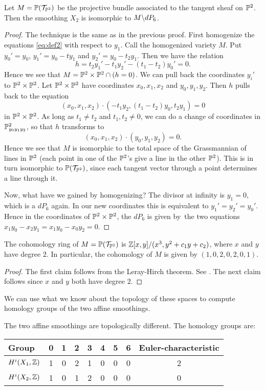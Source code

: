 \begin{lemma}
Let $M=\mathbb{P}(\mathcal T_ {\mathbb{P}^2})$ be the projective bundle associated to the tangent sheaf on $\mathbb{P}^2$. Then the smoothing $X_2$ is isomorphic to $M \backslash dP_6$. 
\end{lemma}
\begin{proof}
The technique is the same as in the previous proof. First homogenize the equations \eqref{eq:def2} with respect to $y_1$. Call the homogenized variety $M$. Put $y_0'=y_0$, $y_1' = y_0-ty_1$ and $y_2'=y_0-t_2y_1$. Then we have the relation
\[
h = t_2y_1'-t_1y_2' - (t_1-t_2)y_0' = 0.
\]
Hence we see that $M=\mathbb{P}^2 \times \mathbb{P}^2 \cap (h = 0)$. We can pull back the coordinates $y_i'$ to $\mathbb{P}^2 \times \mathbb{P}^2$. Let $\mathbb{P}^2 \times \mathbb{P}^2$ have coordinates $x_0,x_1,x_2$ and $y_0,y_1,y_2$. Then $h$ pulls back to the equation
\[
(x_0,x_1,x_2) \cdot (-t_1y_2, (t_1-t_2)y_0,t_2y_1) = 0
\]
in $\mathbb{P}^2 \times \mathbb{P}^2$. As long as $t_1 \neq t_2$ and $t_1,t_2 \neq 0$, we can do a change of coordinates in $\mathbb{P}^2_{y_0y_1y_2}$, so that $h$ transforms to
\[
(x_0,x_1,x_2) \cdot(y_0,y_1,y_2) = 0.
\]
Hence we see that $M$ is isomorphic to the total space of the Grassmannian of lines in $\mathbb{P}^2$ (each point in one of the $\mathbb{P}^2$'s give a line in the other $\mathbb{P}^2$). This is in turn isomorphic to $\mathbb{P}(\mathcal T_{\mathbb{P}^2})$, since each tangent vector through a point determines a line through it.

Now, what have we gained by homogenizing? The divisor at infinity is $y_1=0$, which is a $dP_6$ again. In our new coordinates this is equivalent to $y_1'=y_2'=y_0'$. Hence in the coordinates of $\mathbb{P}^2 \times \mathbb{P}^2$, the $dP_6$ is given by the two equations $x_1y_0-x_2y_1=x_1y_0-x_0y_2=0$. 
\end{proof}

\begin{lemma}
The cohomology ring of $M=\mathbb{P}(\mathcal T_{\mathbb{P}^2})$ is $\mathbb{Z}[x,y]/(x^3,y^2+c_1y+c_2)$, where $x$ and $y$ have degree $2$. In particular, the cohomology of $M$ is given by $(1,0,2,0,2,0,1)$.
\end{lemma}
\begin{proof}
The first claim follows from the Leray-Hirch theorem. See \cite[page 270]{bott_tu}. The next claim follows since $x$ and $y$ both have degree $2$.
\end{proof}

We can use what we know about the topology of these spaces to compute homology groups of the two affine smoothings.

\begin{thm}
The two affine smoothings are topologically different. The homology groups are:
\begin{center}
\begin{tabular}{ l || c | c | c | c | c | c | c || c }
 Group & 0 & 1 & 2 & 3 & 4 & 5 & 6 & Euler-characteristic \\
\hline
$H^i(X_1,\mathbb{Z})$ & 1 & 0 & 2 & 1 & 0 & 0 & 0 & 2 \\
$H^i(X_2,\mathbb{Z})$ & 1 & 0 & 1 & 2 & 0 & 0 & 0  & 0
\end{tabular}
\end{center}
\end{thm}

